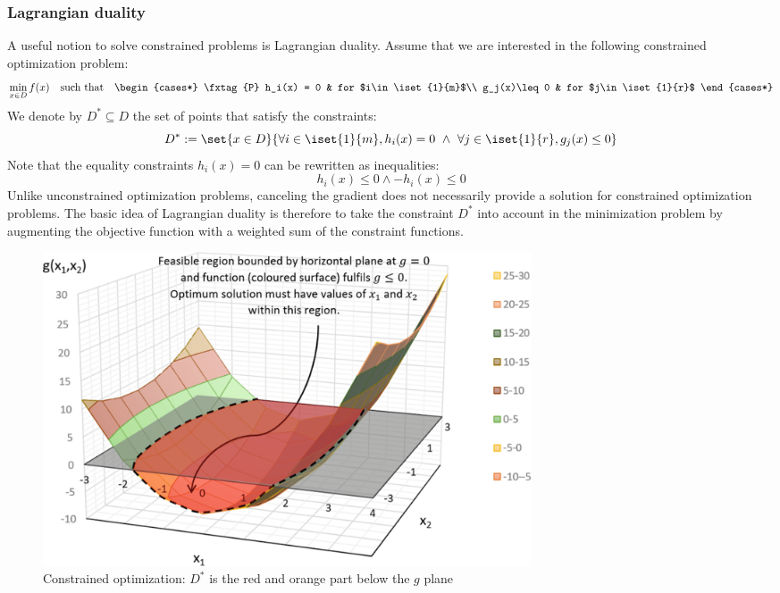 \documentclass{../cs-classes/cs-classes}
\begin{document}
\subsubsection{Lagrangian duality}
A useful notion to solve constrained problems is Lagrangian duality. Assume that we are interested in the following constrained optimization problem:
\begin{equation}
    \label{eq:optimization-problem}
    \min_{x\in D}f(x) \quad \textnormal{such that}\quad 
    \begin{cases*}
        \tag{P}
        h_i(x) = 0 & for $i\in\iset{1}{m}$\\
        g_j(x)\leq0 & for $j\in\iset{1}{r}$
    \end{cases*}
\end{equation}
We denote by $D^*\subseteq D$ the set of points that satisfy the constraints:
\begin{equation*}
    D^* := \set{x\in D}{\forall i\in\iset{1}{m}, h_i(x)=0 \land \forall j\in\iset{1}{r}, g_j(x)\leq 0}
\end{equation*}
Note that the equality constraints $h_i(x)=0$ can be rewritten as inequalities:
\begin{equation*}
    h_i(x)\leq0 \land -h_i(x)\leq0
\end{equation*}
Unlike unconstrained optimization problems, canceling the gradient does not necessarily provide a solution for constrained optimization problems. The basic idea of Lagrangian duality is therefore to take the constraint $D^*$ into account in the minimization problem by augmenting the objective function with a weighted sum of the constraint functions.

\begin{figure}
    \centering
    \includegraphics[width=0.7\textwidth]{images/constrained-optimization.png}
    \caption{Constrained optimization: $D^*$ is the red and orange part below the $g$ plane}
\end{figure}
\end{document}

